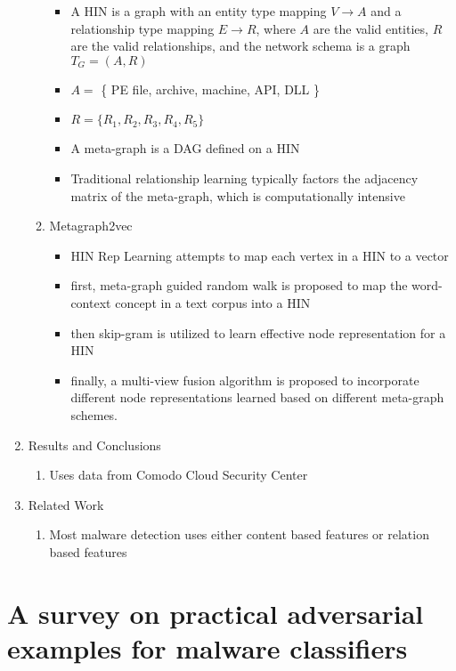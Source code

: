 \documentclass{article}
\begin{document}
\begin{enumerate}
\begin{enumerate}
		\begin{itemize}
			\item A HIN is a graph with an entity type mapping $V \rightarrow A$ and a relationship type mapping $E \rightarrow R$, where $A$ are the valid entities, $R$ are the valid relationships, and the network schema is a graph $T_G = (A, R)$
			\item $A = $ \{ PE file, archive, machine, API, DLL \}
			\item $R = \{R_1, R_2, R_3, R_4, R_5\}$
			\item A meta-graph is a DAG defined on a HIN
			\item Traditional relationship learning typically factors the adjacency matrix of the meta-graph, which is computationally intensive
		\end{itemize}
		\item Metagraph2vec
		\begin{itemize}
			\item HIN Rep Learning attempts to map each vertex in a HIN to a vector
			\item first, meta-graph guided random walk is proposed to map the word-context concept in a text corpus into a HIN
			\item then skip-gram is utilized to learn effective node representation for a HIN
			\item finally, a multi-view fusion algorithm is proposed to incorporate different node representations learned based on different meta-graph schemes.
		\end{itemize}
	\end{enumerate}
	\item Results and Conclusions
	\begin{enumerate}
	\item Uses data from Comodo Cloud Security Center
	\end{enumerate}
	\item Related Work
	\begin{enumerate}
		\item Most malware detection uses either content based features or relation based features
	\end{enumerate}
\end{enumerate}
\pagebreak


\section*{A survey on practical adversarial examples for malware classifiers}
\end{document}
